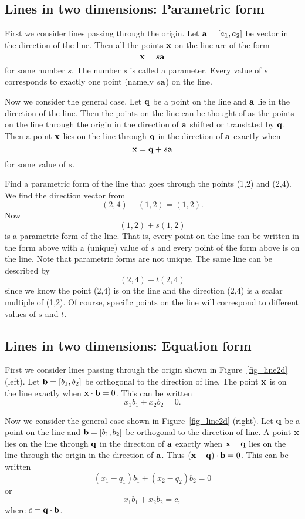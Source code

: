 \subsection{Lines in two dimensions: Parametric form}

First we consider lines passing through the origin.
Let $\aa=[a_1,a_2]$ be 
vector in the direction of the line. Then all the points $\xx$ on the line
are of the form 
\[
\xx = s\aa
\]
for some number $s$. The number $s$ is called a 
parameter. Every value of $s$ corresponds to exactly one point (namely $s\aa$) 
on the line.

Now we consider the general case. Let $\qq$ be a point on the line and $\aa$
lie in the direction of the line. Then the points on the line can be thought of
as the points on the line through the origin in the direction of $\aa$ shifted
or translated by $\qq$. Then a point $\xx$ lies on the line through
$\qq$ in the direction of $\aa$ exactly when 
\[
\xx=\qq+s\aa
\]
for some value of $s$.

\begin{example}
Find a parametric form of the line that goes through the points (1,2) and (2,4). 
{\rm We find the direction vector from 
\[
(2,4) - (1,2) = (1,2). 
\] 
Now 
\[
(1,2) + s (1,2) 
\]
is a parametric form of the line. That is, every point on the line can be written in the form above with a (unique) value of $s$ and every point of the form above is on the line. Note that parametric forms are not unique. The same line can be described by 
\[
(2,4) + t (2,4) 
\]
since we know the point (2,4) is on the line and the direction (2,4) is a scalar multiple of (1,2). Of course, specific points on the line will correspond to different values of $s$ and $t$. 
}
\end{example}



\subsection{Lines in two dimensions: Equation form}

First we consider lines passing through the origin shown in 
Figure~\ref{fig_line2d} (left).
Let $\bb=[b_1,b_2]$ be orthogonal to the direction of line. 
The point $\xx$ is on 
the line exactly when $\xx\cdot\bb=0$. This can be written
\[
x_1b_1 + x_2b_2 = 0.
\]

Now we consider the general case shown in 
Figure~\ref{fig_line2d} (right).
Let $\qq$ be a point on the line and
$\bb=[b_1,b_2]$ be orthogonal to the direction of line. A point $\xx$ lies on
the line through $\qq$ in the direction of $\aa$ exactly when $\xx-\qq$ lies
on the line through the origin in the direction of $\aa$. Thus
$(\xx-\qq)\cdot\bb =0$. This can be written
\[
(x_1-q_1)b_1 + (x_2-q_2)b_2 = 0
\]
or
\[
x_1b_1 + x_2b_2 = c,
\]
where $c=\qq\cdot\bb$. 

